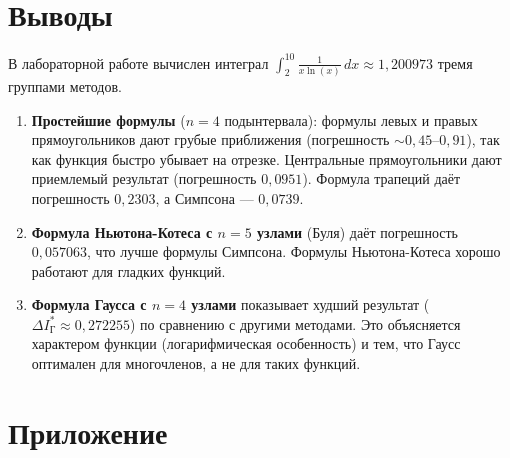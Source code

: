 \documentclass[a4paper, final]{article}
\begin{document}
\newpage

\section{Выводы}

В лабораторной работе вычислен интеграл
$\displaystyle\int_2^{10}\frac{1}{x\ln(x)}\,dx \approx 1{,}200973$
тремя группами методов.

\begin{enumerate}
\item \textbf{Простейшие формулы} ($n=4$ подынтервала): формулы левых и правых
прямоугольников дают грубые приближения (погрешность $\sim 0{,}45$--$0{,}91$),
так как функция быстро убывает на отрезке. Центральные прямоугольники дают
приемлемый результат (погрешность $0{,}0951$). Формула трапеций даёт
погрешность $0{,}2303$, а Симпсона --- $0{,}0739$.

\item \textbf{Формула Ньютона-Котеса с $n=5$ узлами} (Буля) даёт погрешность
$0{,}057063$, что лучше формулы Симпсона. Формулы Ньютона-Котеса
хорошо работают для гладких функций.

\item \textbf{Формула Гаусса с $n=4$ узлами} показывает худший результат
($\Delta I^*_\text{Г} \approx 0{,}272255$) по сравнению с другими методами.
Это объясняется характером функции (логарифмическая особенность)
и тем, что Гаусс оптимален для многочленов, а не для таких функций.
\end{enumerate}

\newpage

\section*{Приложение}
\end{document}
